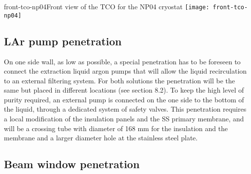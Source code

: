 \begin{cdrfigure}{front-tco-np04}{Front view of the TCO for the NP04 cryostat}
  \texttt{[image: front-tco-np04]}
\end{cdrfigure}


\subsection{LAr pump penetration}

On one side wall, as low as possible, a special penetration has to be foreseen to connect the extraction liquid argon pumps that will allow the liquid recirculation to an external filtering system. For both solutions the penetration will be the same but placed in different locations (see section 8.2).
To keep the high level of purity required, an external pump is connected on the one side to the bottom of the liquid, through a dedicated system of safety valves. This penetration requires a local modification of the insulation panels and the SS primary membrane, and will be a crossing tube with diameter of 168 mm for the insulation and the membrane and a larger diameter hole at the stainless steel plate.

\subsection{Beam window penetration}


